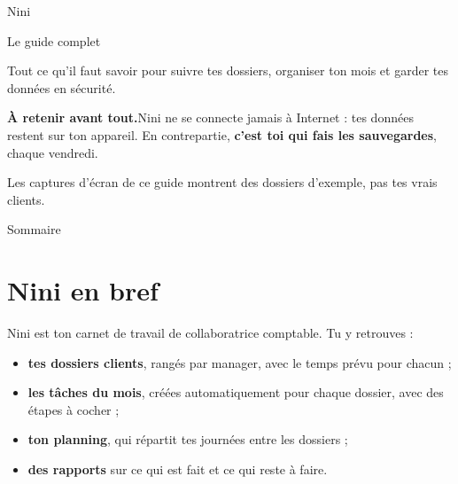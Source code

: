 \documentclass[11pt,a4paper]{article}
\newcommand{\muted}[1]{{\color{ink2}#1}}
\begin{document}
\thispagestyle{empty}

\vspace{10pt}
{\displayfont\fontsize{36}{40}\selectfont Nini\par}
\vspace{2pt}
{\displayfont\fontsize{22}{26}\selectfont\color{ink2} Le guide complet\par}
\vspace{10pt}
{\large\muted{Tout ce qu’il faut savoir pour suivre tes dossiers, organiser ton mois et garder tes données en sécurité.}\par}

\vspace{14pt}
\begin{securite}
\textbf{À retenir avant tout.}\enspace Nini ne se connecte jamais à Internet : tes données restent sur ton appareil.
En contrepartie, \textbf{c’est toi qui fais les sauvegardes}, chaque vendredi.
\end{securite}

\vspace{6pt}
{\small\muted{Les captures d’écran de ce guide montrent des dossiers d’exemple, pas tes vrais clients.}}

\vspace{14pt}
{\displayfont\fontsize{15}{18}\selectfont Sommaire\par}
\vspace{2pt}
{\makeatletter{}\makeatother}

\newpage

\section{Nini en bref}
Nini est ton carnet de travail de collaboratrice comptable. Tu y retrouves :
\begin{itemize}
  \item \textbf{tes dossiers clients}, rangés par manager, avec le temps prévu pour chacun ;
  \item \textbf{les tâches du mois}, créées automatiquement pour chaque dossier, avec des étapes à cocher ;
  \item \textbf{ton planning}, qui répartit tes journées entre les dossiers ;
  \item \textbf{des rapports} sur ce qui est fait et ce qui reste à faire.
\end{itemize}
\end{document}
